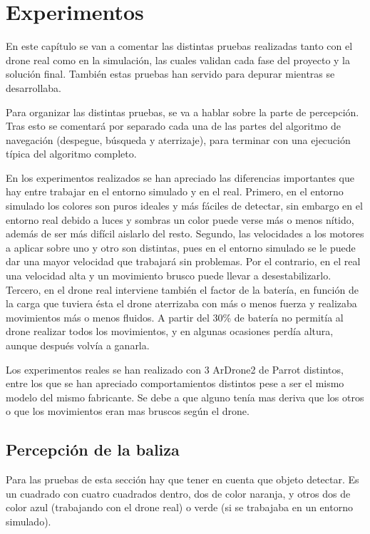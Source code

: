 \chapter{Experimentos}\label{cap.experimentos}
\hspace{1cm} En este cap\'itulo se van a comentar las distintas pruebas realizadas tanto con el drone real como en la simulaci\'on, las cuales validan cada fase del proyecto y la soluci\'on final. Tambi\'en estas pruebas han servido para depurar mientras se desarrollaba. 

\hspace{1cm} Para organizar las distintas pruebas, se va a hablar sobre la parte de percepci\'on. Tras esto se comentar\'a por separado cada una de las partes del algoritmo de navegaci\'on (despegue, b\'usqueda y aterrizaje), para terminar con una ejecuci\'on t\'ipica del algoritmo completo.

\hspace{1cm} En los experimentos realizados se han apreciado las diferencias importantes que hay entre trabajar en el entorno simulado y en el real. Primero, en el entorno simulado los colores son puros ideales y m\'as f\'aciles de detectar, sin embargo en el entorno real debido a luces y sombras un color puede verse m\'as o menos n\'itido, adem\'as de ser m\'as dif\'icil aislarlo del resto. Segundo, las velocidades a los motores a aplicar sobre uno y otro son distintas, pues en el entorno simulado se le puede dar una mayor velocidad que trabajar\'a sin problemas. Por el contrario, en el real una velocidad alta y un movimiento brusco puede llevar a desestabilizarlo. Tercero, en el drone real interviene tambi\'en el factor de la bater\'ia, en funci\'on de la carga que tuviera \'esta el drone aterrizaba con m\'as o menos fuerza y realizaba movimientos m\'as o menos fluidos. A partir del 30\% de bater\'ia no permit\'ia al drone realizar todos los movimientos, y en algunas ocasiones perd\'ia altura, aunque despu\'es volv\'ia a ganarla. 

\hspace{1cm} Los experimentos reales se han realizado con 3 ArDrone2 de Parrot distintos, entre los que se han apreciado comportamientos distintos pese a ser el mismo modelo del mismo fabricante. Se debe a que alguno ten\'ia mas deriva que los otros o que los movimientos eran mas bruscos seg\'un el drone.


\section{Percepci\'on de la baliza}\label{sec:percepcion}
\hspace{1cm} Para las pruebas de esta secci\'on hay que tener en cuenta que objeto detectar. Es un cuadrado con cuatro cuadrados dentro, dos de color naranja, y otros dos de color azul (trabajando con el drone real) o verde (si se trabajaba en un entorno simulado). 

